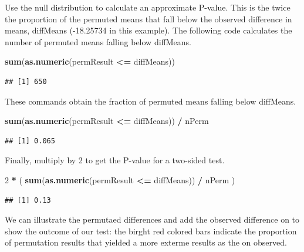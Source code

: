 \documentclass[]{article}
\newenvironment{Shaded}{\begin{snugshade}}{\end{snugshade}}
\newcommand{\DecValTok}[1]{\textcolor[rgb]{0.00,0.00,0.81}{#1}}
\newcommand{\KeywordTok}[1]{\textcolor[rgb]{0.13,0.29,0.53}{\textbf{#1}}}
\newcommand{\NormalTok}[1]{#1}
\newcommand{\OperatorTok}[1]{\textcolor[rgb]{0.81,0.36,0.00}{\textbf{#1}}}
\newcommand{\StringTok}[1]{\textcolor[rgb]{0.31,0.60,0.02}{#1}}
\begin{document}
Use the null distribution to calculate an approximate P-value. This is
the twice the proportion of the permuted means that fall below the
observed difference in means, diffMeans (-18.25734 in this example). The
following code calculates the number of permuted means falling below
diffMeans.

\begin{Shaded}
\begin{Highlighting}[]
\KeywordTok{sum}\NormalTok{(}\KeywordTok{as.numeric}\NormalTok{(permResult }\OperatorTok{<=}\StringTok{ }\NormalTok{diffMeans))}
\end{Highlighting}
\end{Shaded}

\begin{verbatim}
## [1] 650
\end{verbatim}

These commands obtain the fraction of permuted means falling below
diffMeans.

\begin{Shaded}
\begin{Highlighting}[]
\KeywordTok{sum}\NormalTok{(}\KeywordTok{as.numeric}\NormalTok{(permResult }\OperatorTok{<=}\StringTok{ }\NormalTok{diffMeans)) }\OperatorTok{/}\StringTok{ }\NormalTok{nPerm}
\end{Highlighting}
\end{Shaded}

\begin{verbatim}
## [1] 0.065
\end{verbatim}

Finally, multiply by 2 to get the P-value for a two-sided test.

\begin{Shaded}
\begin{Highlighting}[]
\DecValTok{2} \OperatorTok{*}\StringTok{ }\NormalTok{( }\KeywordTok{sum}\NormalTok{(}\KeywordTok{as.numeric}\NormalTok{(permResult }\OperatorTok{<=}\StringTok{ }\NormalTok{diffMeans)) }\OperatorTok{/}\StringTok{ }\NormalTok{nPerm )}
\end{Highlighting}
\end{Shaded}

\begin{verbatim}
## [1] 0.13
\end{verbatim}

We can illustrate the permutaed differences and add the observed
difference on to show the outcome of our test: the birght red colored
bars indicate the proportion of permutation results that yielded a more
exterme results as the on observed.
\end{document}

